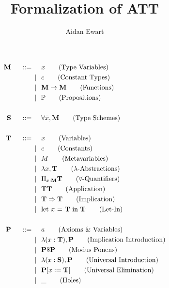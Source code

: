 \documentclass{article}
\author{Aidan Ewart}
\title{Formalization of ATT}
\newcommand{\prop}{\mathbb{P}}
\newcommand{\bnfdef}{\hspace{0.5cm} ::= \hspace{0.5cm}}
\newcommand{\alt}{\hspace{0.25cm} | \hspace{0.25cm}}
\newcommand{\bb}{\mathbf}
\begin{document}
\begin{align*}
    \bb{M} \bnfdef&
        x
        \tag{Type Variables}
    \\\alt&
        c
        \tag{Constant Types}
    \\\alt&
        \bb{M} \to \bb{M}
        \tag{Functions}
    \\\alt&
        \prop
        \tag{Propositions}
    \\\\\bb{S} \bnfdef&
        \forall{\bar{x}}, \bb{M}
        \tag{Type Schemes}
    \\\\\bb{T} \bnfdef&
        x
        \tag{Variables}
    \\\alt&
        c
        \tag{Constants}
    \\\alt&
        M
        \tag{Metavariables}
    \\\alt&
        \lambda x, \bb{T}
        \tag{$\lambda$-Abstractions}
    \\\alt&
        \Pi_{x : \bb{M}} \bb{T}
        \tag{$\forall$-Quantifiers}
    \\\alt&
        \bb{T} \bb{T}
        \tag{Application}
    \\\alt&
        \bb{T} \Rightarrow \bb{T}
        \tag{Implication}
    \\\alt&
        \text{let $x$ = $\bb{T}$ in $\bb{T}$}
        \tag{Let-In}
    \\\\\bb{P} \bnfdef&
        a
        \tag{Axioms \& Variables}
    \\\alt&
        \lambda (x : \bb{T}), \bb{P}
        \tag{Implication Introduction}
    \\\alt&
        \bb{P} \$ \bb{P}
        \tag{Modus Ponens}
    \\\alt&
        \lambda (x : \bb{S}), \bb{P}
        \tag{Universal Introduction}
    \\\alt&
        \bb{P}[x := \bb{T}]
        \tag{Universal Elimination}
    \\\alt&
        \_
        \tag{Holes}
\end{align*}
\end{document}
